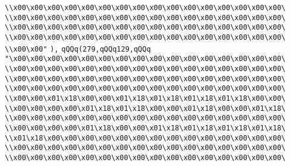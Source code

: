 \verb|\\x00\x00\x00\x00\x00\x00\x00\x00\x00\x00\x00\x00\x00\x00\x00\x00\|\newline
\verb|\\x00\x00\x00\x00\x00\x00\x00\x00\x00\x00\x00\x00\x00\x00\x00\x00\|\newline
\verb|\\x00\x00\x00\x00\x00\x00\x00\x00\x00\x00\x00\x00\x00\x00\x00\x00\|\newline
\verb|\\x00\x00\x00\x00\x00\x00\x00\x00\x00\x00\x00\x00\x00\x00\x00\x00\|\newline
\verb|\\x00\x00"|\newline
\verb|),|\newline
\verb|qQQq(279,qQQq129,qQQq|\newline
\verb|"\x00\x00\x00\x00\x00\x00\x00\x00\x00\x00\x00\x00\x00\x00\x00\x00\|\newline
\verb|\\x00\x00\x00\x00\x00\x00\x00\x00\x00\x00\x00\x00\x00\x00\x00\x00\|\newline
\verb|\\x00\x00\x00\x00\x00\x00\x00\x00\x00\x00\x00\x00\x00\x00\x00\x00\|\newline
\verb|\\x00\x00\x00\x00\x00\x00\x00\x00\x00\x00\x00\x00\x00\x00\x00\x00\|\newline
\verb|\\x00\x00\x01\x18\x00\x00\x01\x18\x01\x18\x01\x18\x01\x18\x00\x00\|\newline
\verb|\\x00\x00\x00\x00\x01\x18\x01\x18\x00\x00\x01\x18\x00\x00\x01\x18\|\newline
\verb|\\x00\x00\x00\x00\x00\x00\x00\x00\x00\x00\x00\x00\x00\x00\x00\x00\|\newline
\verb|\\x00\x00\x00\x00\x01\x18\x00\x00\x01\x18\x01\x18\x01\x18\x01\x18\|\newline
\verb|\\x01\x18\x00\x00\x00\x00\x00\x00\x00\x00\x00\x00\x00\x00\x00\x00\|\newline
\verb|\\x00\x00\x00\x00\x00\x00\x00\x00\x00\x00\x00\x00\x00\x00\x00\x00\|\newline
\verb|\\x00\x00\x00\x00\x00\x00\x00\x00\x00\x00\x00\x00\x00\x00\x00\x00\|\newline
